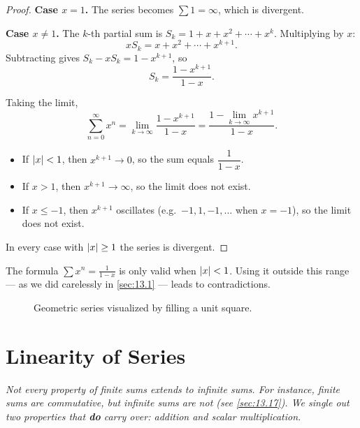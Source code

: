 \begin{proof}
\textbf{Case $x=1$.}  The series becomes $\sum 1 = \infty$, which is divergent.

\textbf{Case $x\neq 1$.}  The $k$-th partial sum is $S_{k}=1+x+x^{2}+\cdots+x^{k}$.  Multiplying by $x$:
\[
  xS_{k} = x+x^{2}+\cdots+x^{k+1}.
\]
Subtracting gives $S_{k}-xS_{k}=1-x^{k+1}$, so
\[
  S_{k} = \frac{1-x^{k+1}}{1-x}.
\]

Taking the limit,
\[
  \sum_{n=0}^{\infty}x^{n} = \lim_{k\to\infty}\frac{1-x^{k+1}}{1-x} = \frac{1-\lim_{k\to\infty}x^{k+1}}{1-x}.
\]
\begin{itemize}
  \item If $\left\lvert x \right\rvert<1$, then $x^{k+1}\to 0$, so the sum equals $\dfrac{1}{1-x}$.
  \item If $x>1$, then $x^{k+1}\to\infty$, so the limit does not exist.
  \item If $x\le -1$, then $x^{k+1}$ oscillates (e.g.\ $-1,1,-1,\ldots$ when $x=-1$), so the limit does not exist.
\end{itemize}
In every case with $\left\lvert x \right\rvert\ge 1$ the series is divergent.
\end{proof}

\begin{remark}[Warning]
The formula $\sum x^{n}=\frac{1}{1-x}$ is only valid when $\left\lvert x \right\rvert<1$.  Using it outside this range --- as we did carelessly in \cref{sec:13.1} --- leads to contradictions.
\end{remark}

\begin{figure}[ht]
  \centering
  
  \caption{Geometric series visualized by filling a unit square.}
  \label{fig:geometric-series-area}
\end{figure}

\section{Linearity of Series}
\label{sec:13.6}

\textit{Not every property of finite sums extends to infinite sums.  For instance, finite sums are commutative, but infinite sums are not (see \cref{sec:13.17}).  We single out two properties that \textbf{do} carry over: addition and scalar multiplication.}


